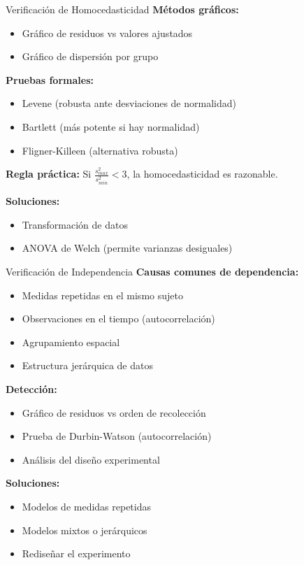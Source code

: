 \documentclass[aspectratio=169]{beamer}
\begin{document}
\begin{frame}{Verificación de Homocedasticidad}
\textbf{Métodos gráficos:}
\begin{itemize}
\item Gráfico de residuos vs valores ajustados
\item Gráfico de dispersión por grupo
\end{itemize}

\vspace{0.3cm}
\textbf{Pruebas formales:}
\begin{itemize}
\item Levene (robusta ante desviaciones de normalidad)
\item Bartlett (más potente si hay normalidad)
\item Fligner-Killeen (alternativa robusta)
\end{itemize}

\vspace{0.3cm}
\textbf{Regla práctica:} Si $\frac{s_{max}^2}{s_{min}^2} < 3$, la homocedasticidad es razonable.

\vspace{0.3cm}
\textbf{Soluciones:}
\begin{itemize}
\item Transformación de datos
\item ANOVA de Welch (permite varianzas desiguales)
\end{itemize}
\end{frame}

\begin{frame}{Verificación de Independencia}
\textbf{Causas comunes de dependencia:}
\begin{itemize}
\item Medidas repetidas en el mismo sujeto
\item Observaciones en el tiempo (autocorrelación)
\item Agrupamiento espacial
\item Estructura jerárquica de datos
\end{itemize}

\vspace{0.3cm}
\textbf{Detección:}
\begin{itemize}
\item Gráfico de residuos vs orden de recolección
\item Prueba de Durbin-Watson (autocorrelación)
\item Análisis del diseño experimental
\end{itemize}

\vspace{0.3cm}
\textbf{Soluciones:}
\begin{itemize}
\item Modelos de medidas repetidas
\item Modelos mixtos o jerárquicos
\item Rediseñar el experimento
\end{itemize}
\end{frame}
\end{document}
